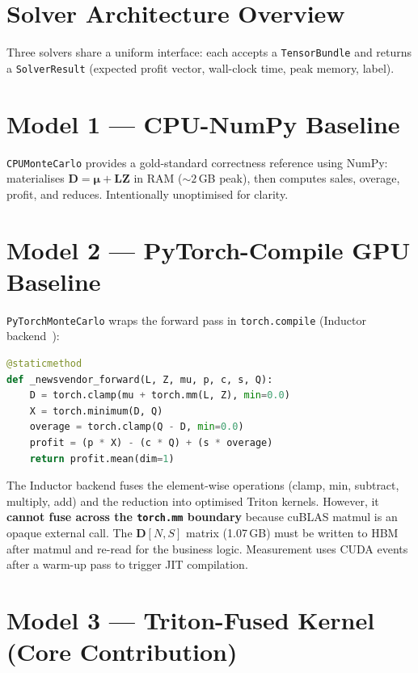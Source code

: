 \section{Solver Architecture Overview}

Three solvers share a uniform interface: each accepts a \texttt{TensorBundle} and returns a \texttt{SolverResult} (expected profit vector, wall-clock time, peak memory, label).

\section{Model 1 --- CPU-NumPy Baseline}

\texttt{CPUMonteCarlo} provides a gold-standard correctness reference using NumPy: materialises $\mathbf{D} = \bm{\mu} + \mathbf{L}\mathbf{Z}$ in RAM (${\sim}2$\,GB peak), then computes sales, overage, profit, and reduces. Intentionally unoptimised for clarity.

\section{Model 2 --- PyTorch-Compile GPU Baseline}

\texttt{PyTorchMonteCarlo} wraps the forward pass in \texttt{torch.compile} (Inductor backend~\citep{ansel2024}):

\begin{lstlisting}[language=Python, caption={PyTorch-Compile newsvendor forward pass.}, label={lst:pytorch}]
@staticmethod
def _newsvendor_forward(L, Z, mu, p, c, s, Q):
    D = torch.clamp(mu + torch.mm(L, Z), min=0.0)
    X = torch.minimum(D, Q)
    overage = torch.clamp(Q - D, min=0.0)
    profit = (p * X) - (c * Q) + (s * overage)
    return profit.mean(dim=1)
\end{lstlisting}

The Inductor backend fuses the element-wise operations (clamp, min, subtract, multiply, add) and the reduction into optimised Triton kernels. However, it \textbf{cannot fuse across the \texttt{torch.mm} boundary} because cuBLAS matmul is an opaque external call. The $\mathbf{D}[N,S]$ matrix (1.07\,GB) must be written to HBM after matmul and re-read for the business logic. Measurement uses CUDA events after a warm-up pass to trigger JIT compilation.

\section{Model 3 --- Triton-Fused Kernel (Core Contribution)}\label{sec:triton}

